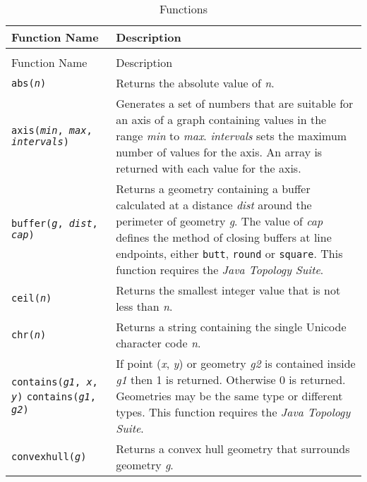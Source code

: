 \begin{longtable}{|p{5cm}|p{7cm}|}
\hline
\label{functions}
Function Name & Description \\
\hline
\hline
\endfirsthead
\hline
\caption{Functions} \\
\endfoot

\hline
Function Name & Description \\
\hline
\hline
\endhead

\texttt{abs(\textit{n})} &
Returns the absolute value of \textit{n}. \\

\hline

\texttt{axis(\textit{min}, \textit{max}, \textit{intervals})} &
Generates a set of numbers that are suitable for an axis of a graph
containing values in the range \textit{min} to \textit{max}.
\textit{intervals} sets the maximum number of values for the axis.
An array is returned with each value for the axis. \\

\hline

\texttt{buffer(\textit{g}, \textit{dist}, \textit{cap})} &
Returns a geometry containing a buffer calculated at
a distance \textit{dist} around the perimeter of geometry \textit{g}.
The value of \textit{cap} defines
the method of closing buffers at line endpoints, either
\texttt{butt}, \texttt{round} or \texttt{square}.
This function requires the \textit{Java Topology Suite}. \\

\hline

\texttt{ceil(\textit{n})} &
Returns the smallest integer value that is not less than \textit{n}. \\

\hline

\texttt{chr(\textit{n})} &
Returns a string containing the single Unicode character code \textit{n}. \\

\hline

\texttt{contains(\textit{g1}, \textit{x}, \textit{y})}
\texttt{contains(\textit{g1}, \textit{g2})} &
If point (\textit{x}, \textit{y}) or geometry \textit{g2}
is contained inside \textit{g1} then
1 is returned.  Otherwise 0 is returned.
Geometries may be the same type or different types.
This function requires the \textit{Java Topology Suite}. \\

\hline

\texttt{convexhull(\textit{g})} &
Returns a convex hull geometry that surrounds geometry \textit{g}. \\


\end{longtable}
